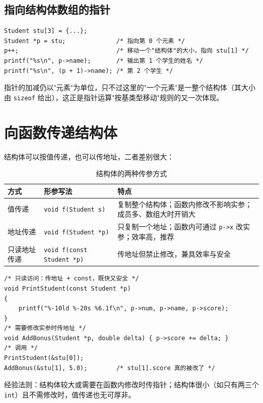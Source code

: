 
\subsection{指向结构体数组的指针}
\begin{lstlisting}
Student stu[3] = {...};
Student *p = stu;              /* 指向第 0 个元素 */
p++;                           /* 移动一个"结构体"的大小，指向 stu[1] */
printf("%s\n", p->name);       /* 输出第 1 个学生的姓名 */
printf("%s\n", (p + 1)->name); /* 第 2 个学生 */
\end{lstlisting}
指针的加减仍以"元素"为单位，只不过这里的"一个元素"是一整个结构体（其大小由 \texttt{sizeof} 给出），这正是指针运算"按基类型移动"规则的又一次体现。

\section{向函数传递结构体}
结构体可以按值传递，也可以传地址，二者差别很大：

\begin{table}[htbp]
\centering
\caption{结构体的两种传参方式}
\footnotesize
\begin{tabularx}{\textwidth}{@{}p{3.2cm}p{3.6cm}X@{}}
\toprule
方式 & 形参写法 & 特点 \\
\midrule
值传递 & \texttt{void f(Student s)} & 复制整个结构体；函数内修改不影响实参；成员多、数组大时开销大 \\
地址传递 & \texttt{void f(Student *p)} & 只复制一个地址；函数内可通过 \texttt{p->x} 改实参；效率高，推荐 \\
只读地址传递 & \texttt{void f(const Student *p)} & 传地址但禁止修改，兼具效率与安全 \\
\bottomrule
\end{tabularx}
\end{table}

\begin{lstlisting}
/* 只读访问：传地址 + const，既快又安全 */
void PrintStudent(const Student *p)
{
    printf("%-10ld %-20s %6.1f\n", p->num, p->name, p->score);
}
/* 需要修改实参时传地址 */
void AddBonus(Student *p, double delta) { p->score += delta; }
/* 调用 */
PrintStudent(&stu[0]);
AddBonus(&stu[1], 5.0);        /* stu[1].score 真的被改了 */
\end{lstlisting}
经验法则：结构体较大或需要在函数内修改时传指针；结构体很小（如只有两三个 \texttt{int}）且不需修改时，值传递也无可厚非。

